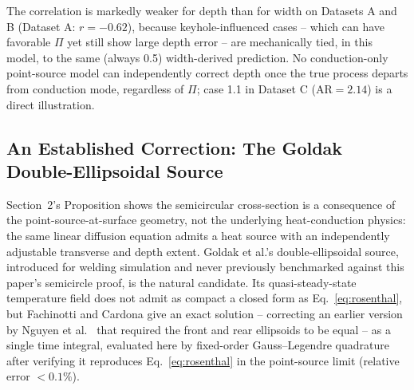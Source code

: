 \documentclass[12pt]{article}
\begin{document}
The correlation is markedly weaker for depth than for width on Datasets A and B (Dataset A: $r=-0.62$), because keyhole-influenced cases -- which can have favorable $\Pi$ yet still show large depth error -- are mechanically tied, in this model, to the same (always 0.5) width-derived prediction. No conduction-only point-source model can independently correct depth once the true process departs from conduction mode, regardless of $\Pi$; case 1.1 in Dataset C (AR$=2.14$) is a direct illustration.

\subsection{An Established Correction: The Goldak Double-Ellipsoidal Source}
\label{sec:goldak}

Section~2's Proposition shows the semicircular cross-section is a consequence of the point-source-at-surface geometry, not the underlying heat-conduction physics: the same linear diffusion equation admits a heat source with an independently adjustable transverse and depth extent. Goldak et al.'s \cite{goldak1984} double-ellipsoidal source, introduced for welding simulation and never previously benchmarked against this paper's semicircle proof, is the natural candidate. Its quasi-steady-state temperature field does not admit as compact a closed form as Eq.~\ref{eq:rosenthal}, but Fachinotti and Cardona \cite{fachinotti2008} give an exact solution -- correcting an earlier version by Nguyen et al.\ \cite{nguyen1999} that required the front and rear ellipsoids to be equal -- as a single time integral, evaluated here by fixed-order Gauss--Legendre quadrature after verifying it reproduces Eq.~\ref{eq:rosenthal} in the point-source limit (relative error $<0.1\%$).
\end{document}
